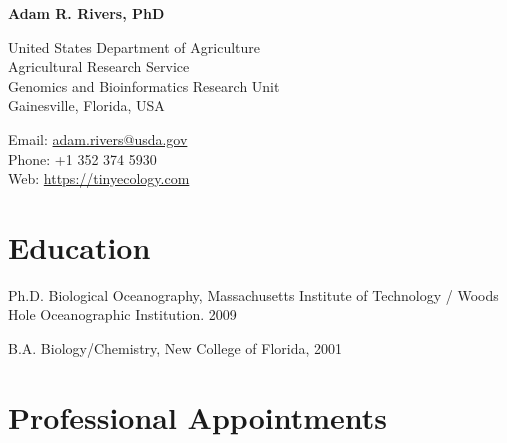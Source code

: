\documentclass[12pt,letterpaper]{report}
\newcommand{\myname}{Adam R. Rivers, PhD}
\newcommand{\namefont}[1]{{\normalfont\bfseries\Huge{#1}}}
\begin{document}
    \raggedright

    \namefont{\myname}

    \vspace{1em}
    \begin{minipage}[t]{0.68\textwidth}
        United States Department of Agriculture \\
        Agricultural Research Service\\
        Genomics and Bioinformatics Research Unit\\
        Gainesville, Florida, USA
    \end{minipage}
    \begin{minipage}[t]{0.31\textwidth}
        Email: \href{mailto:adam.rivers@usda.gov}{adam.rivers@usda.gov} \\
        Phone: +1 352 374 5930\\
        Web: \href{https://tinyecology.com/}{https://tinyecology.com}
    \end{minipage}
    \vspace{0.5em}



    \section*{Education}

    \begin{tablist}

        \item[Ph.D.] \tab Biological Oceanography, Massachusetts Institute of Technology / Woods Hole Oceanographic Institution. 2009

        \item[B.A.]  \tab Biology/Chemistry, New College of Florida, 2001

    \end{tablist}



    \section*{Professional Appointments}
\end{document}

